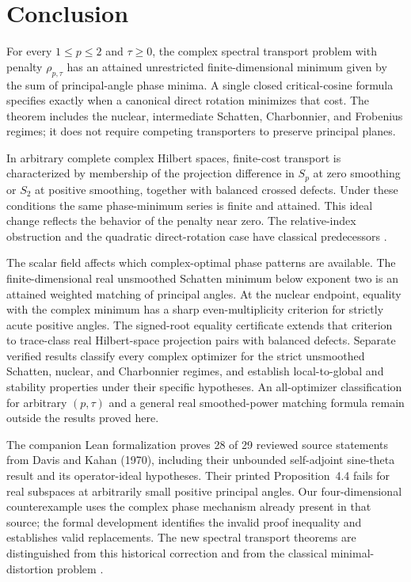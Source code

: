 \documentclass[11pt]{article}
\begin{document}
\section{Conclusion}
\label{sec:conclusion}

For every $1\le p\le2$ and $\tau\ge0$, the complex spectral transport
problem with penalty $\rho_{p,\tau}$ has an attained unrestricted
finite-dimensional minimum given by the sum of principal-angle phase
minima.  A single closed critical-cosine formula specifies exactly when
a canonical direct rotation minimizes that cost.  The theorem includes
the nuclear, intermediate Schatten, Charbonnier, and Frobenius regimes;
it does not require competing transporters to preserve principal planes.

In arbitrary complete complex Hilbert spaces, finite-cost transport is
characterized by membership of the projection difference in $S_p$ at
zero smoothing or $S_2$ at positive smoothing, together with balanced
crossed defects.  Under these conditions the same phase-minimum series
is finite and attained.  This ideal change reflects the behavior of
the penalty near zero.  The relative-index obstruction and the
quadratic direct-rotation case have classical predecessors
\citep{davis1958separation,avron1994index}.

The scalar field affects which complex-optimal phase patterns are
available.  The finite-dimensional real unsmoothed Schatten minimum
below exponent two is an attained weighted matching of principal
angles.  At the nuclear endpoint, equality with the complex minimum
has a sharp even-multiplicity criterion for strictly acute positive
angles.  The signed-root equality certificate extends that criterion
to trace-class real Hilbert-space projection pairs with balanced
defects.  Separate verified results classify every complex optimizer
for the strict unsmoothed Schatten, nuclear, and Charbonnier regimes,
and establish local-to-global and stability properties under their
specific hypotheses.  An all-optimizer classification for arbitrary
$(p,\tau)$ and a general real smoothed-power matching formula remain
outside the results proved here.

The companion Lean formalization proves 28 of 29 reviewed source
statements from Davis and Kahan (1970), including their unbounded
self-adjoint sine-theta result and its operator-ideal hypotheses.
Their printed Proposition~4.4 fails for real subspaces at arbitrarily
small positive principal angles.  Our four-dimensional counterexample
uses the complex phase mechanism already present in that source; the
formal development identifies the invalid proof inequality and
establishes valid replacements.  The new spectral transport theorems
are distinguished from this historical correction and from the
classical minimal-distortion problem \citep{bolotnikov2001minimal}.
\end{document}
